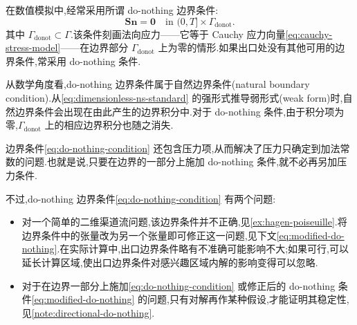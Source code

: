 \begin{note}\label{note:do-nothing-boundary}
在数值模拟中,经常采用所谓 do-nothing 边界条件:
\begin{equation}\label{eq:do-nothing-condition}
  \bm{S}\bm{n}=\bm{0}
  \quad\text{in }(0,T]\times\Gamma_{\mathrm{donot}}.
\end{equation}
其中 $\Gamma_{\mathrm{donot}}\subset\Gamma$.该条件刻画法向应力——它等于 Cauchy 应力向量\cref{eq:cauchy-stress-model}——在边界部分 $\Gamma_{\mathrm{donot}}$ 上为零的情形.如果出口处没有其他可用的边界条件,常采用 do-nothing 条件.

从数学角度看,do-nothing 边界条件属于自然边界条件(natural boundary condition).从\cref{eq:dimensionless-ns-standard} 的强形式推导弱形式(weak form)时,自然边界条件会出现在由此产生的边界积分中.对于 do-nothing 条件,由于积分项为零,$\Gamma_{\mathrm{donot}}$ 上的相应边界积分也随之消失.

边界条件\cref{eq:do-nothing-condition} 还包含压力项,从而解决了压力只确定到加法常数的问题.也就是说,只要在边界的一部分上施加 do-nothing 条件,就不必再另加压力条件.

不过,do-nothing 边界条件\cref{eq:do-nothing-condition} 有两个问题:
\begin{itemize}
  \item 对一个简单的二维渠道流问题,该边界条件并不正确,见\cref{ex:hagen-poiseuille}.将边界条件中的张量改为另一个张量即可修正这一问题,见下文\cref{eq:modified-do-nothing}.在实际计算中,出口边界条件略有不准确可能影响不大;如果可行,可以延长计算区域,使出口边界条件对感兴趣区域内解的影响变得可以忽略.
  \item 对于在边界一部分上施加\cref{eq:do-nothing-condition} 或修正后的 do-nothing 条件\cref{eq:modified-do-nothing} 的问题,只有对解再作某种假设,才能证明其稳定性,见\cref{note:directional-do-nothing}.
\end{itemize}
\end{note}

